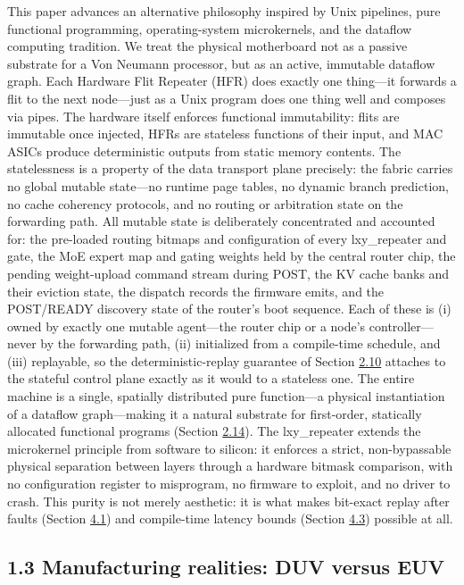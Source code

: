 \documentclass[12pt,onecolumn]{article}
\begin{document}
This paper advances an alternative philosophy inspired by Unix pipelines\cite{7}, pure functional programming\cite{6}, operating-system microkernels\cite{8}, and the dataflow computing tradition\cite{11,12}. We treat the physical motherboard not as a passive substrate for a Von Neumann processor, but as an active, immutable dataflow graph. Each Hardware Flit Repeater (HFR) does exactly one thing---it forwards a flit to the next node---just as a Unix program does one thing well and composes via pipes. The hardware itself enforces functional immutability: flits are immutable once injected, HFRs are stateless functions of their input, and MAC ASICs produce deterministic outputs from static memory contents. The statelessness is a property of the data transport plane precisely: the fabric carries no global mutable state---no runtime page tables, no dynamic branch prediction, no cache coherency protocols, and no routing or arbitration state on the forwarding path. All mutable state is deliberately concentrated and accounted for: the pre-loaded routing bitmaps and configuration of every lxy\_repeater and gate, the MoE expert map and gating weights held by the central router chip, the pending weight-upload command stream during POST, the KV cache banks and their eviction state, the dispatch records the firmware emits, and the POST/READY discovery state of the router's boot sequence. Each of these is (i) owned by exactly one mutable agent---the router chip or a node's controller---never by the forwarding path, (ii) initialized from a compile-time schedule, and (iii) replayable, so the deterministic-replay guarantee of Section \hyperref[sec:2.10]{2.10} attaches to the stateful control plane exactly as it would to a stateless one. The entire machine is a single, spatially distributed pure function---a physical instantiation of a dataflow graph---making it a natural substrate for first-order, statically allocated functional programs (Section \hyperref[sec:2.14]{2.14}). The lxy\_repeater extends the microkernel principle from software to silicon: it enforces a strict, non-bypassable physical separation between layers through a hardware bitmask comparison, with no configuration register to misprogram, no firmware to exploit, and no driver to crash\cite{9}. This purity is not merely aesthetic: it is what makes bit-exact replay after faults (Section \hyperref[sec:4.1]{4.1}) and compile-time latency bounds (Section \hyperref[sec:4.3]{4.3}) possible at all.

\subsection*{1.3 Manufacturing realities: DUV versus EUV}\label{sec:1.3}
\end{document}
